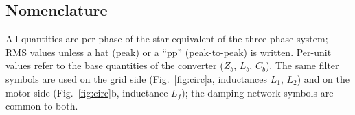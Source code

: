 \documentclass[10pt,a4paper]{scrartcl}
\newcommand{\Lf}{L_{f}}
\begin{document}

\tableofcontents
\newpage
\begin{onehalfspace}

\section*{Nomenclature}
All quantities are per phase of the star equivalent of the three-phase system; RMS values unless a hat (peak) or a ``pp'' (peak-to-peak) is written. Per-unit values refer to the base quantities of the converter ($Z_b$, $L_b$, $C_b$). The same filter symbols are used on the grid side (Fig.~\ref{fig:circ}a, inductances $L_1$, $L_2$) and on the motor side (Fig.~\ref{fig:circ}b, inductance $\Lf$); the damping-network symbols are common to both.


\end{onehalfspace}
\end{document}
